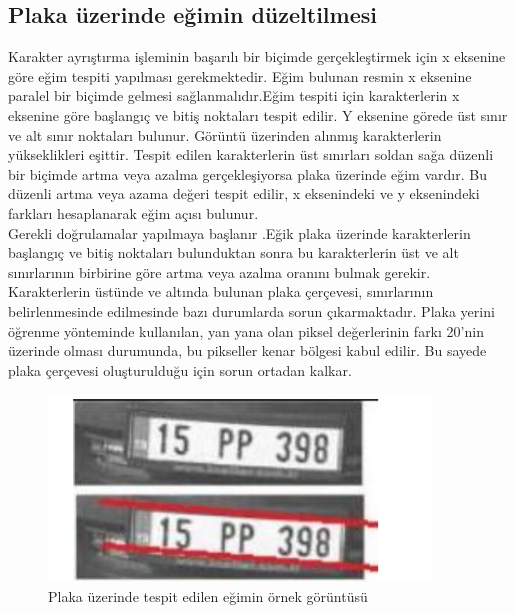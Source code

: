 \subsection{Plaka üzerinde eğimin düzeltilmesi}
\cite{detection}
Karakter ayrıştırma işleminin başarılı bir biçimde gerçekleştirmek için x eksenine göre eğim tespiti yapılması gerekmektedir. Eğim bulunan resmin x eksenine paralel bir biçimde gelmesi sağlanmalıdır.Eğim tespiti için karakterlerin x eksenine göre başlangıç ve bitiş noktaları tespit edilir. Y eksenine görede üst sınır ve alt sınır noktaları bulunur. Görüntü üzerinden alınmış karakterlerin yükseklikleri eşittir. Tespit edilen karakterlerin üst sınırları soldan sağa düzenli bir biçimde artma veya azalma gerçekleşiyorsa plaka üzerinde eğim vardır. Bu düzenli artma veya azama değeri tespit edilir, x eksenindeki ve y eksenindeki farkları hesaplanarak eğim açısı bulunur. 
\\
\cite{verification}
Gerekli doğrulamalar yapılmaya başlanır .Eğik plaka üzerinde karakterlerin başlangıç ve bitiş noktaları bulunduktan sonra bu karakterlerin üst ve alt sınırlarının birbirine göre artma veya azalma oranını bulmak gerekir. Karakterlerin üstünde ve altında bulunan plaka çerçevesi, sınırlarının belirlenmesinde edilmesinde bazı durumlarda sorun çıkarmaktadır. Plaka yerini öğrenme yönteminde kullanılan, yan yana olan piksel değerlerinin farkı 20’nin üzerinde olması durumunda, bu pikseller kenar bölgesi kabul edilir. Bu sayede plaka çerçevesi oluşturulduğu için sorun ortadan kalkar.
\begin{figure}
    \centering
    \includegraphics{plaka eğimi.PNG}
    \caption{Plaka üzerinde tespit edilen eğimin örnek görüntüsü}
    \label{fig:my_label}
\end{figure}
